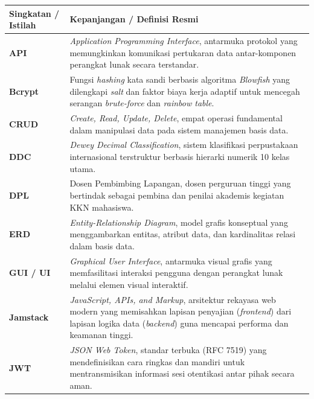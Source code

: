 \documentclass[
  indonesian,
  12pt,
]{report}
\newcounter{none} %
\begin{document}
{\def\LTcaptype{none} %
\begin{longtable}[]{@{}
  >{\raggedright\arraybackslash}p{}
  >{\raggedright\arraybackslash}p{}@{}}
\toprule\noalign{}
\begin{minipage}[b]{\linewidth}\raggedright
Singkatan / Istilah
\end{minipage} & \begin{minipage}[b]{\linewidth}\raggedright
Kepanjangan / Definisi Resmi
\end{minipage} \\
\midrule\noalign{}
\endhead
\bottomrule\noalign{}
\endlastfoot
\textbf{API} & \emph{Application Programming Interface}, antarmuka
protokol yang memungkinkan komunikasi pertukaran data antar-komponen
perangkat lunak secara terstandar. \\
\textbf{Bcrypt} & Fungsi \emph{hashing} kata sandi berbasis algoritma
\emph{Blowfish} yang dilengkapi \emph{salt} dan faktor biaya kerja
adaptif untuk mencegah serangan \emph{brute-force} dan \emph{rainbow
table}. \\
\textbf{CRUD} & \emph{Create, Read, Update, Delete}, empat operasi
fundamental dalam manipulasi data pada sistem manajemen basis data. \\
\textbf{DDC} & \emph{Dewey Decimal Classification}, sistem klasifikasi
perpustakaan internasional terstruktur berbasis hierarki numerik 10
kelas utama. \\
\textbf{DPL} & Dosen Pembimbing Lapangan, dosen perguruan tinggi yang
bertindak sebagai pembina dan penilai akademis kegiatan KKN
mahasiswa. \\
\textbf{ERD} & \emph{Entity-Relationship Diagram}, model grafis
konseptual yang menggambarkan entitas, atribut data, dan kardinalitas
relasi dalam basis data. \\
\textbf{GUI / UI} & \emph{Graphical User Interface}, antarmuka visual
grafis yang memfasilitasi interaksi pengguna dengan perangkat lunak
melalui elemen visual interaktif. \\
\textbf{Jamstack} & \emph{JavaScript, APIs, and Markup}, arsitektur
rekayasa web modern yang memisahkan lapisan penyajian (\emph{frontend})
dari lapisan logika data (\emph{backend}) guna mencapai performa dan
keamanan tinggi. \\
\textbf{JWT} & \emph{JSON Web Token}, standar terbuka (RFC 7519) yang
mendefinisikan cara ringkas dan mandiri untuk mentransmisikan informasi
sesi otentikasi antar pihak secara aman. \\

\end{longtable}}
\end{document}
